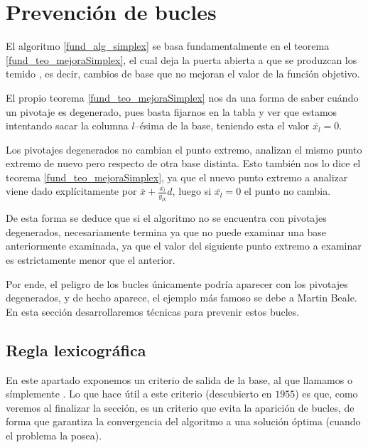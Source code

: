 \section{Prevención de bucles}
El algoritmo \ref{fund_alg_simplex} se basa fundamentalmente en el teorema \ref{fund_teo_mejoraSimplex}, el cual deja la puerta abierta a que se produzcan los temido , es decir, cambios de base que no mejoran el valor de la función objetivo.

El propio teorema \ref{fund_teo_mejoraSimplex} nos da una forma de saber cuándo un pivotaje es degenerado, pues basta fijarnos en la tabla y ver que estamos intentando sacar la columna $l$--ésima de la base, teniendo esta el valor $\overline{x_l}=0$.

Los pivotajes degenerados no cambian el punto extremo, analizan el mismo punto extremo de nuevo pero respecto de otra base distinta. Esto también nos lo dice el teorema \ref{fund_teo_mejoraSimplex}, ya que el nuevo punto extremo a analizar viene dado explícitamente por $\overline{x}+\frac{\overline{x_l}}{y_{lk}} d$, luego si $\overline{x_l}=0$ el punto no cambia.

De esta forma se deduce que si el algoritmo no se encuentra con pivotajes degenerados, necesariamente termina ya que no puede examinar una base anteriormente examinada, ya que el valor del siguiente punto extremo a examinar es estrictamente menor que el anterior.

Por ende, el peligro de los bucles únicamente podría aparecer con los pivotajes degenerados, y de hecho aparece, el ejemplo más famoso se debe a Martin Beale. En esta sección desarrollaremos técnicas para prevenir estos bucles.
\subsection{Regla lexicográfica}
En este apartado exponemos un criterio de salida de la base, al que llamamos  o símplemente . Lo que hace útil a este criterio (descubierto en $1955$) es que, como veremos al finalizar la sección, es un criterio que evita la aparición de bucles, de forma que garantiza la convergencia del algoritmo a una solución óptima (cuando el problema la posea).

